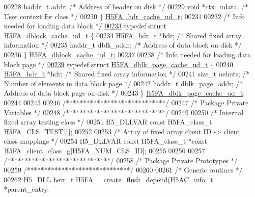 \begin{DoxyCode}
00228     haddr\_t    addr;            \textcolor{comment}{/* Address of header on disk */}
00229     \textcolor{keywordtype}{void}       *ctx\_udata;      \textcolor{comment}{/* User context for class */}
00230 \} \hyperlink{struct_h5_f_a__hdr__cache__ud__t}{H5FA\_hdr\_cache\_ud\_t};
00231 
00232 \textcolor{comment}{/* Info needed for loading data block */}
\hyperlink{struct_h5_f_a__dblock__cache__ud__t}{00233} \textcolor{keyword}{typedef} \textcolor{keyword}{struct }\hyperlink{struct_h5_f_a__dblock__cache__ud__t}{H5FA\_dblock\_cache\_ud\_t} \{
00234     \hyperlink{struct_h5_f_a__hdr__t}{H5FA\_hdr\_t} *hdr;            \textcolor{comment}{/* Shared fixed array information       */}
00235     haddr\_t     dblk\_addr;      \textcolor{comment}{/* Address of data block on disk        */}
00236 \} \hyperlink{struct_h5_f_a__dblock__cache__ud__t}{H5FA\_dblock\_cache\_ud\_t};
00237 
00238 \textcolor{comment}{/* Info needed for loading data block page */}
\hyperlink{struct_h5_f_a__dblk__page__cache__ud__t}{00239} \textcolor{keyword}{typedef} \textcolor{keyword}{struct }\hyperlink{struct_h5_f_a__dblk__page__cache__ud__t}{H5FA\_dblk\_page\_cache\_ud\_t} \{
00240     \hyperlink{struct_h5_f_a__hdr__t}{H5FA\_hdr\_t} *hdr;            \textcolor{comment}{/* Shared fixed array information           */}
00241     \textcolor{keywordtype}{size\_t} nelmts;              \textcolor{comment}{/* Number of elements in data block page    */}
00242     haddr\_t     dblk\_page\_addr; \textcolor{comment}{/* Address of data block page on disk */}
00243 \} \hyperlink{struct_h5_f_a__dblk__page__cache__ud__t}{H5FA\_dblk\_page\_cache\_ud\_t};
00244 
00245 
00246 \textcolor{comment}{/*****************************/}
00247 \textcolor{comment}{/* Package Private Variables */}
00248 \textcolor{comment}{/*****************************/}
00249 
00250 \textcolor{comment}{/* Internal fixed array testing class */}
00251 H5\_DLLVAR \textcolor{keyword}{const} H5FA\_class\_t H5FA\_CLS\_TEST[1];
00252 
00253 \textcolor{comment}{/* Array of fixed array client ID -> client class mappings */}
00254 H5\_DLLVAR \textcolor{keyword}{const} H5FA\_class\_t *\textcolor{keyword}{const} H5FA\_client\_class\_g[H5FA\_NUM\_CLS\_ID];
00255 
00256 
00257 \textcolor{comment}{/******************************/}
00258 \textcolor{comment}{/* Package Private Prototypes */}
00259 \textcolor{comment}{/******************************/}
00260 
00261 \textcolor{comment}{/* Generic routines */}
00262 H5\_DLL herr\_t H5FA\_\_create\_flush\_depend(H5AC\_info\_t *parent\_entry,

\end{DoxyCode}
